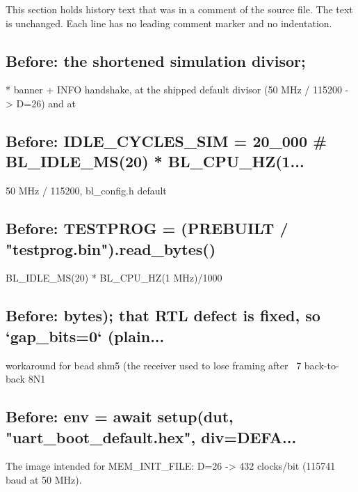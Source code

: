 This section holds history text that was in a comment of the source file. The text is unchanged. Each line has no leading comment marker and no indentation.

\begin{record}

\subsection*{Before: the shortened simulation divisor;}

\begin{textblock}
* banner + INFO handshake, at the shipped default divisor (50 MHz / 115200 -> D=26) and at
\end{textblock}

\subsection*{Before: IDLE\_CYCLES\_SIM = 20\_000  \# BL\_IDLE\_MS(20) * BL\_CPU\_HZ(1...}

\begin{textblock}
50 MHz / 115200, bl_config.h default
\end{textblock}

\subsection*{Before: TESTPROG = (PREBUILT / "testprog.bin").read\_bytes()}

\begin{textblock}
BL_IDLE_MS(20) * BL_CPU_HZ(1 MHz)/1000
\end{textblock}

\subsection*{Before: bytes); that RTL defect is fixed, so `gap\_bits=0` (plain...}

\begin{textblock}
workaround for bead shm5 (the receiver used to lose framing after ~7 back-to-back 8N1
\end{textblock}

\subsection*{Before: env = await setup(dut, "uart\_boot\_default.hex", div=DEFA...}

\begin{textblock}
The image intended for MEM_INIT_FILE: D=26 -> 432 clocks/bit (115741 baud at 50 MHz).
\end{textblock}


\end{record}
